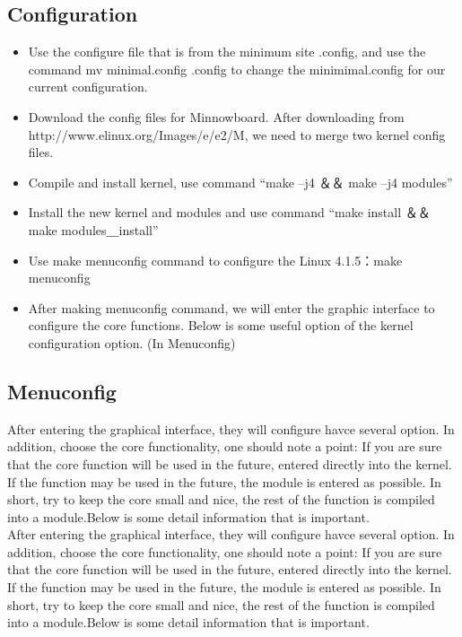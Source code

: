 \documentclass[10pt,draftclsnofoot,peerreview ,letterpaper,onecolumn,]{IEEEtran}
\begin{document}
	\subsection{Configuration}
	\begin{itemize}
		\item Use the configure file that is from the minimum site .config, and use the command mv minimal.config .config to change the minimimal.config for our current configuration.\\
		\item Download the config files for Minnowboard. After downloading from http://www.elinux.org/Images/e/e2/M, we need to merge two kernel config files. \\
		\item Compile and install kernel, use command “make –j4 ＆＆ make –j4 modules” \\
		\item Install the new kernel and modules and use command “make install ＆＆ make modules＿install”\\
		\item Use make menuconfig command to configure the Linux 4.1.5：make menuconfig \\
		\item After making menuconfig command, we will enter the graphic interface to configure the core functions. Below is some useful option of the kernel configuration option. (In Menuconfig)
	\end{itemize}
	
	\subsection{Menuconfig}
	After entering the graphical interface, they will configure havce several option. In addition, choose the core functionality, one should note a point: If you are sure that the core function will be used in the future, entered directly into the kernel. If the function may be used in the future, the module is entered as possible. In short, try to keep the core small and nice, the rest of the function is compiled into a module.Below is some detail information that is important.\\
	After entering the graphical interface, they will configure havce several option. In addition, choose the core functionality, one should note a point: If you are sure that the core function will be used in the future, entered directly into the kernel. If the function may be used in the future, the module is entered as possible. In short, try to keep the core small and nice, the rest of the function is compiled into a module.Below is some detail information that is important.\\
\end{document}
